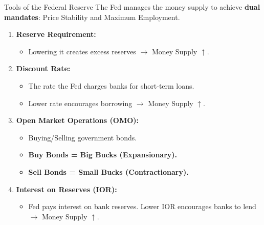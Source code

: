 \documentclass[aspectratio=169]{beamer}
\begin{document}
\begin{frame}{Tools of the Federal Reserve}
    The Fed manages the money supply to achieve \textbf{dual mandates}: Price Stability and Maximum Employment.

    \begin{enumerate}
        \item \textbf{Reserve Requirement:}
        \begin{itemize}
            \item Lowering it creates excess reserves $\rightarrow$ Money Supply $\uparrow$.
        \end{itemize}
        \item \textbf{Discount Rate:}
        \begin{itemize}
            \item The rate the Fed charges banks for short-term loans.
            \item Lower rate encourages borrowing $\rightarrow$ Money Supply $\uparrow$.
        \end{itemize}
        \item \textbf{Open Market Operations (OMO):}
        \begin{itemize}
            \item Buying/Selling government bonds.
            \item \textbf{Buy Bonds = Big Bucks (Expansionary).}
            \item \textbf{Sell Bonds = Small Bucks (Contractionary).}
        \end{itemize}
        \item \textbf{Interest on Reserves (IOR):}
        \begin{itemize}
            \item Fed pays interest on bank reserves. Lower IOR encourages banks to lend $\rightarrow$ Money Supply $\uparrow$.
        \end{itemize}
    \end{enumerate}
\end{frame}
\end{document}
